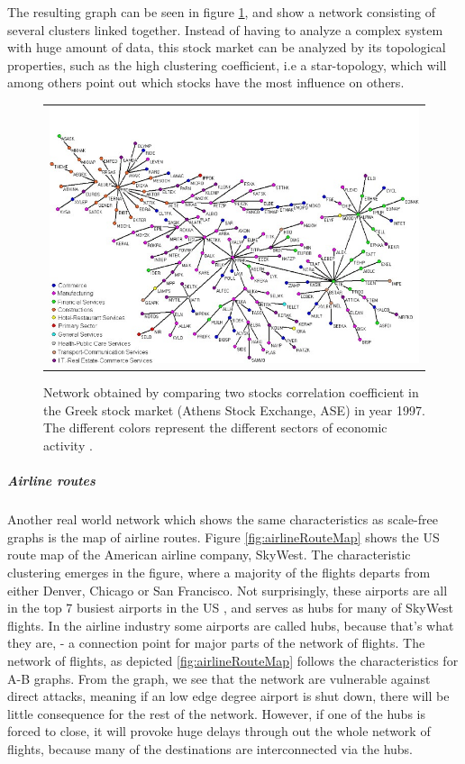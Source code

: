 The resulting graph can be seen in figure \ref{fig:greekStockMarket}, and show a network consisting of several clusters linked together. Instead of having to analyze a complex system with huge amount of data, this stock market can be analyzed by its topological properties, such as the high clustering coefficient, i.e a star-topology, which will among others point out which stocks have the most influence on others. 
\begin{figure}[h]
\centering
\begin{tabular}{@{}c@{}}
\includegraphics[width=1.0\textwidth]{../Figures/greekStockMarket.jpg}
\end{tabular}
\caption[Caption for LOF]{Network obtained by comparing two stocks correlation coefficient in the Greek stock market (Athens Stock Exchange, ASE) in year 1997. The different colors represent the different sectors of economic activity \cite{greekStockMarket}.
\label{fig:greekStockMarket}}
\end{figure}

\subparagraph{Airline routes}
Another real world network which shows the same characteristics as scale-free graphs is the map of airline routes. Figure \ref{fig:airlineRouteMap} shows the US route map of the American airline company, SkyWest. The characteristic clustering emerges in the figure, where a majority of the flights departs from either Denver, Chicago or San Francisco. Not surprisingly, these airports are all in the top 7 busiest airports in the US \cite{busiestAirports}, and serves as hubs for many of SkyWest flights. In the airline industry some airports are called hubs, because that's what they are, - a connection point for major parts of the network of flights. The network of flights, as depicted \ref{fig:airlineRouteMap} follows the characteristics for A-B graphs. From the graph, we see that the network are vulnerable against direct attacks, meaning if an low edge degree airport is shut down, there will be little consequence for the rest of the network. However, if one of the hubs is forced to close, it will provoke huge delays through out the whole network of flights, because many of the destinations are interconnected via the hubs. 



